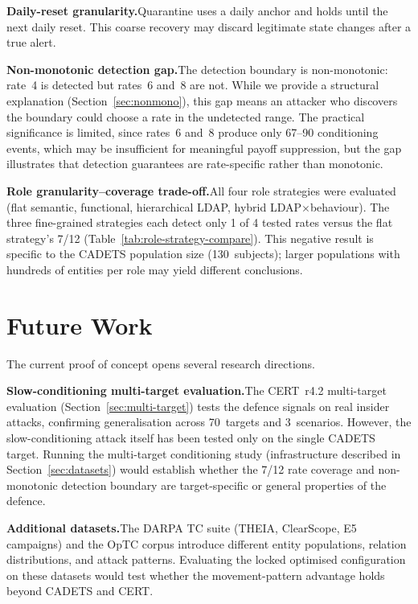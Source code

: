 \documentclass[10pt,twocolumn]{article}
\begin{document}
\textbf{Daily-reset granularity.}\quad Quarantine uses a daily anchor and
holds until the next daily reset.  This coarse recovery may discard
legitimate state changes after a true alert.

\textbf{Non-monotonic detection gap.}\quad The detection boundary is
non-monotonic: rate~4 is detected but rates~6 and~8 are not.  While we
provide a structural explanation (Section~\ref{sec:nonmono}), this gap
means an attacker who discovers the boundary could choose a rate in the
undetected range.  The practical significance is limited, since rates~6
and~8 produce only 67--90 conditioning events, which may be insufficient
for meaningful payoff suppression, but the gap illustrates that detection
guarantees are rate-specific rather than monotonic.

\textbf{Role granularity--coverage trade-off.}\quad All four role
strategies were evaluated (flat semantic, functional, hierarchical LDAP,
hybrid LDAP$\times$behaviour).  The three fine-grained strategies each
detect only 1 of 4 tested rates versus the flat strategy's 7/12
(Table~\ref{tab:role-strategy-compare}).  This negative result is specific
to the CADETS population size (130~subjects); larger populations with
hundreds of entities per role may yield different conclusions.

\section{Future Work}
\label{sec:future}

The current proof of concept opens several research directions.

\textbf{Slow-conditioning multi-target evaluation.}\quad The CERT~r4.2
multi-target evaluation (Section~\ref{sec:multi-target}) tests the defence
signals on real insider attacks, confirming generalisation across 70~targets
and 3~scenarios.  However, the slow-conditioning attack itself has been
tested only on the single CADETS target.  Running the multi-target
conditioning study (infrastructure described in Section~\ref{sec:datasets})
would establish whether the 7/12 rate coverage and non-monotonic detection
boundary are target-specific or general properties of the defence.

\textbf{Additional datasets.}\quad The DARPA TC suite (THEIA, ClearScope,
E5 campaigns) and the OpTC corpus introduce different entity populations,
relation distributions, and attack patterns.  Evaluating the locked
optimised configuration on these datasets would test whether the
movement-pattern advantage holds beyond CADETS and CERT.
\end{document}
